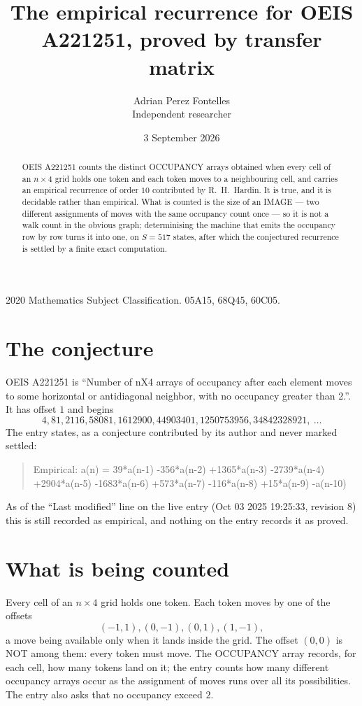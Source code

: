 \documentclass[11pt,a4paper]{article}
\title{The empirical recurrence for OEIS A221251, proved by transfer matrix}
\author{Adrian Perez Fontelles\\ \small Independent researcher}
\date{3 September 2026}
\theoremstyle{plain}
\theoremstyle{definition}
\begin{document}
\maketitle

\begin{abstract}
OEIS A221251 counts the distinct OCCUPANCY arrays obtained when every cell of an $n\times4$ grid
holds one token and each token moves to a neighbouring cell, and carries an empirical
recurrence of order $10$ contributed by R.~H.~Hardin. It is true, and it is decidable
rather than empirical. What is counted is the size of an IMAGE --- two different assignments of
moves with the same occupancy count once --- so it is not a walk count in the obvious graph;
determinising the machine that emits the occupancy row by row turns it into one, on $S=517$
states, after which the conjectured recurrence is settled by a finite exact computation.
\end{abstract}

\noindent\small 2020 Mathematics Subject Classification. 05A15, 68Q45, 60C05.\normalsize

\section{The conjecture}

OEIS A221251 is ``Number of nX4 arrays of occupancy after each element moves to some horizontal or antidiagonal neighbor, with no occupancy greater than 2.''. It has offset $1$ and begins
\[
4, 81, 2116, 58081, 1612900, 44903401, 1250753956, 34842328921,\ \dots
\]
The entry states, as a conjecture contributed by its author and never marked settled:
\begin{quote}
Empirical: a(n) = 39*a(n-1) -356*a(n-2) +1365*a(n-3) -2739*a(n-4) +2904*a(n-5) -1683*a(n-6) +573*a(n-7) -116*a(n-8) +15*a(n-9) -a(n-10)
\end{quote}
As of the ``Last modified'' line on the live entry (Oct 03 2025 19:25:33, revision 8) this is still
recorded as empirical, and nothing on the entry records it as proved.

\section{What is being counted}

Every cell of an $n\times4$ grid holds one token. Each token moves by one of the offsets
\[
(-1,1), (0,-1), (0,1), (1,-1),
\]
a move being available only when it lands inside the grid. The offset $(0,0)$ is NOT among them: every token must move. The OCCUPANCY array
records, for each cell, how many tokens land on it; the entry counts how many different
occupancy arrays occur as the assignment of moves runs over all its possibilities. The entry also asks that no occupancy exceed $2$.
\end{document}
